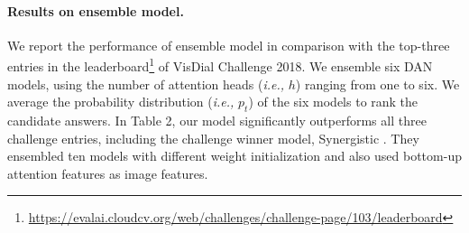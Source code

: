 \documentclass[11pt,a4paper]{article}
\begin{document}
\begin{table}
\centering
{}
\caption{Test-std performance of ensemble model on VisDial v1.0 dataset. We cite top-three entries from VisDial Challenge 2018 Leaderboard.}
\label{tab:t3}
\end{table}

\paragraph{Results on ensemble model.} We report the performance of ensemble model in comparison with the top-three entries in the leaderboard\footnote{\url{https://evalai.cloudcv.org/web/challenges/challenge-page/103/leaderboard}} of VisDial Challenge 2018. We ensemble six DAN models, using the number of attention heads ({\it i.e.,} $h$) ranging from one to six. We average the probability distribution ({\it i.e.,} $p_t$) of the six models to rank the candidate answers. In Table 2, our model significantly outperforms all three challenge entries, including the challenge winner model, Synergistic \cite{guo2019image}. They ensembled ten models with different weight initialization and also used bottom-up attention features \cite{Anderson2017up-down} as image features. 
\end{document}
